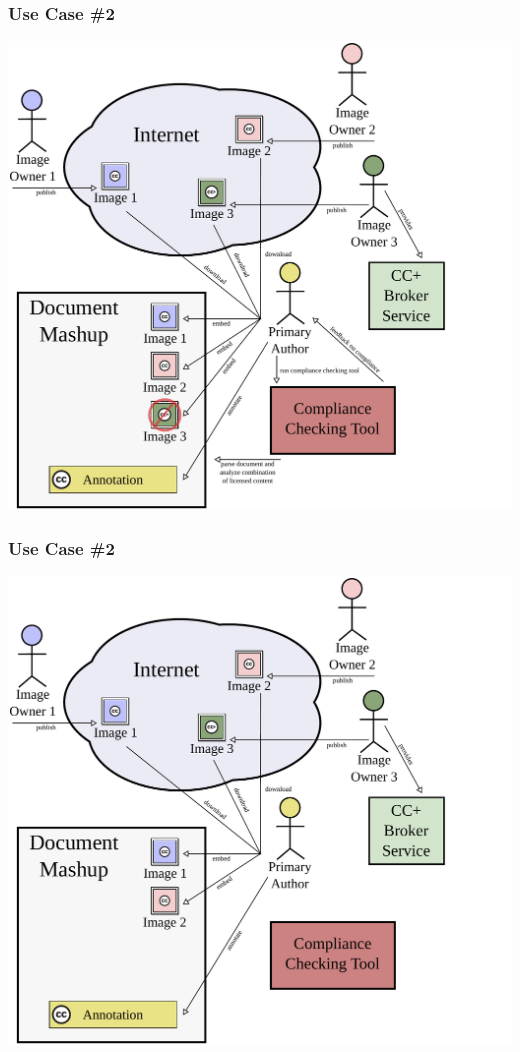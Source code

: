\documentclass[mathserif,xcolor=dvipsnames,hyperref={bookmarks=true}]{beamer}
\begin{document}
    \begin{frame}[t]
        \frametitle{Use Case \#2}
        \begin{center}
            \includegraphics[width=0.9\textheight]{../resources/usecases/usecase2/usecase2-step30.pdf}
        \end{center}
    \end{frame}
    \begin{frame}[t]
        \frametitle{Use Case \#2}
        \begin{center}
            \includegraphics[width=0.9\textheight]{../resources/usecases/usecase2/usecase2-step31.pdf}
        \end{center}
    \end{frame}
\end{document}
